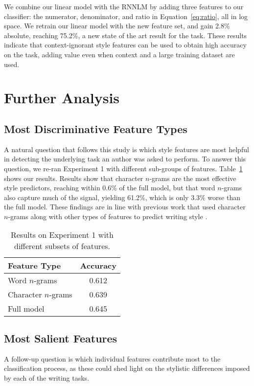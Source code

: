 \documentclass[11pt,a4paper]{article}
\newcommand{\tabref}[1]{Table~\ref{#1}}
\newcommand{\isection}[2]{\section{#1}\label{ssec:#2}}
\begin{document}
We combine our linear model with the RNNLM by adding three features to
our classifier: the numerator, denominator, and ratio in
Equation~\ref{eq:ratio}, all in log space. 
We retrain our linear  model with the new feature set, and gain 2.8\%
absolute, reaching 75.2\%, a new state of the art result for the task.
These results indicate that context-ignorant style features can be used to obtain high
accuracy on the task, adding value even when context and a large
training dataset are used. 




\isection{Further Analysis}{Ablation}


\subsection{Most Discriminative Feature Types}
A natural question that follows this study is which style features are most
helpful in detecting the underlying task an author was asked
to perform. 
To answer this question, we re-ran Experiment 1 with different sub-groups of features. 
\tabref{subgroups} shows our results. Results show that  character $n$-grams are the most effective style predictors, reaching within  0.6\% of the full model, but that word $n$-grams also capture much of the signal, yielding 61.2\%, which is only 3.3\% worse than the full model. 
These findings are in line with previous work that used character $n$-grams along with other types of features to predict writing  style \cite{Schwartz:2013}.


\begin{table}[!t]
\begin{center}
\begin{tabular}{|l|c|} \hline
{\bf Feature Type} & {\bf Accuracy}\\ \hline
Word $n$-grams & 0.612 \\ \hline
Character $n$-grams & 0.639 \\ \hline
Full model & 0.645 \\ \hline

\end{tabular}
\end{center}
\caption{\label{subgroups}
Results on Experiment 1 with different subsets of features.
}
\end{table}

\subsection{Most Salient Features}
A follow-up question is which individual features contribute most to the classification process,
as these could shed light on the stylistic differences imposed by each of the writing tasks.
\end{document}
